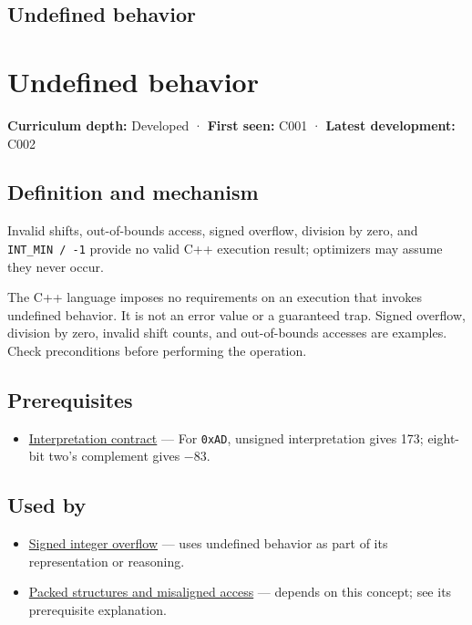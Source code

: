 \hypertarget{appendix-f558f5b4d8f2}{}
\section*{Undefined behavior}
\chapter{Undefined behavior}\label{appendix-f558f5b4d8f2-undefined-behavior}

\textbf{Curriculum depth:} Developed · \textbf{First seen:} C001 · \textbf{Latest development:} C002

\section{Definition and mechanism}\label{appendix-f558f5b4d8f2-definition-and-mechanism}

Invalid shifts, out-of-bounds access, signed overflow, division by zero, and \texttt{INT\_MIN\ /\ -1} provide no valid C++ execution result; optimizers may assume they never occur.

The C++ language imposes no requirements on an execution that invokes undefined behavior. It is not an error value or a guaranteed trap. Signed overflow, division by zero, invalid shift counts, and out-of-bounds accesses are examples. Check preconditions before performing the operation.

\section{Prerequisites}\label{appendix-f558f5b4d8f2-prerequisites}

\begin{itemize}
\tightlist
\item
  \hyperref[appendix-f414bd4ed05c]{Interpretation contract} --- For \texttt{0xAD}, unsigned interpretation gives 173; eight-bit two's complement gives −83.
\end{itemize}

\section{Used by}\label{appendix-f558f5b4d8f2-used-by}

\begin{itemize}
\item
  \hyperref[appendix-1a599c924a4e]{Signed integer overflow} --- uses undefined behavior as part of its representation or reasoning.
\item
  \hyperref[appendix-0682dbfc5f0e]{Packed structures and misaligned access} --- depends on this concept; see its prerequisite explanation.
\end{itemize}

